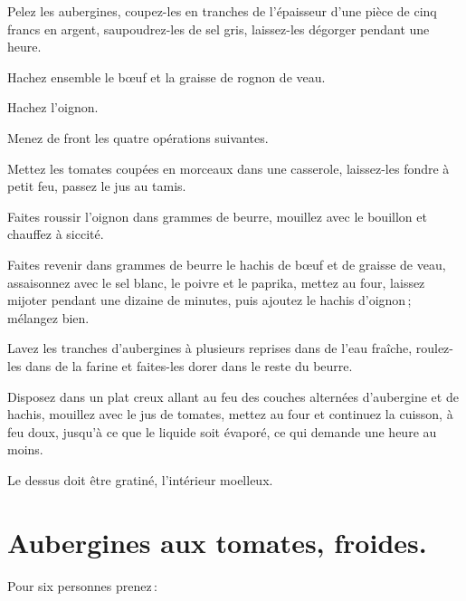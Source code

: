 Pelez les aubergines, coupez-les en tranches de l'épaisseur d'une pièce de cinq
francs en argent, saupoudrez-les de sel gris, laissez-les dégorger pendant une
heure.

Hachez ensemble le bœuf et la graisse de rognon de veau.

Hachez l'oignon.

Menez de front les quatre opérations suivantes.

Mettez les tomates coupées en morceaux dans une casserole, laissez-les fondre à
petit feu, passez le jus au tamis.

Faites roussir l'oignon dans {\mmm} grammes de beurre, mouillez avec le
bouillon et chauffez à siccité.

Faites revenir dans {\mmm} grammes de beurre le hachis de bœuf et de
graisse de veau, assaisonnez avec le sel blanc, le poivre et le paprika, mettez
au four, laissez mijoter pendant une dizaine de minutes, puis ajoutez le hachis
d'oignon ; mélangez bien.

Lavez les tranches d'aubergines à plusieurs reprises dans de l’eau fraîche,
roulez-les dans de la farine et faites-les dorer dans le reste du beurre.

Disposez dans un plat creux allant au feu des couches alternées d'aubergine et
de hachis, mouillez avec le jus de tomates, mettez au four et continuez la cuisson,
à feu doux, jusqu'à ce que le liquide soit évaporé, ce qui demande une heure au
moins.

Le dessus doit être gratiné, l'intérieur moelleux.

\section*{\centering Aubergines aux tomates, froides.}
{}

Pour six personnes prenez :

